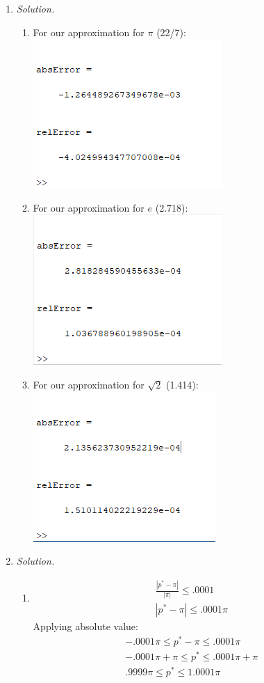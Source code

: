 \documentclass[12pt,letterpaper]{article}
\begin{document}
\begin{enumerate}
    \item \emph{Solution.} 
    \begin{enumerate}
      \item For our approximation for $\pi$ (22/7): \\
      \includegraphics{pi error.png}
      \item For our approximation for $e$ (2.718): \\
      \includegraphics{exp error .png}
      \item For our approximation for $\sqrt{2}$ (1.414): \\
      \includegraphics{root2 error.png}
    \end{enumerate}

    \item \emph{Solution.}
    \begin{enumerate}
      \item 
      \begin{gather}
        \frac{|p^* - \pi|}{|\pi|} \leq .0001 \\
        |p^* - \pi| \leq .0001\pi
      \end{gather}
      Applying absolute value: 
      \begin{gather}
        -.0001\pi \leq p^*-\pi \leq .0001\pi \\
        -.0001\pi + \pi \leq p^* \leq .0001\pi + \pi\\
        .9999\pi \leq p^* \leq 1.0001\pi
      \end{gather}


\end{enumerate}
\end{enumerate}
\end{document}
